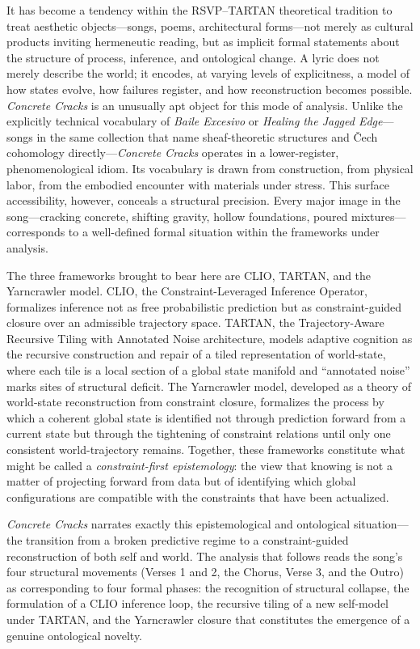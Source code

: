 \documentclass[12pt, a4paper]{article}
\begin{document}
It has become a tendency within the RSVP--TARTAN theoretical tradition to treat aesthetic objects---songs, poems, architectural forms---not merely as cultural products inviting hermeneutic reading, but as implicit formal statements about the structure of process, inference, and ontological change. A lyric does not merely describe the world; it encodes, at varying levels of explicitness, a model of how states evolve, how failures register, and how reconstruction becomes possible. \textit{Concrete Cracks} is an unusually apt object for this mode of analysis. Unlike the explicitly technical vocabulary of \textit{Baile Excesivo} or \textit{Healing the Jagged Edge}---songs in the same collection that name sheaf-theoretic structures and Čech cohomology directly---\textit{Concrete Cracks} operates in a lower-register, phenomenological idiom. Its vocabulary is drawn from construction, from physical labor, from the embodied encounter with materials under stress. This surface accessibility, however, conceals a structural precision. Every major image in the song---cracking concrete, shifting gravity, hollow foundations, poured mixtures---corresponds to a well-defined formal situation within the frameworks under analysis.

The three frameworks brought to bear here are CLIO, TARTAN, and the Yarncrawler model. CLIO, the Constraint-Leveraged Inference Operator, formalizes inference not as free probabilistic prediction but as constraint-guided closure over an admissible trajectory space. TARTAN, the Trajectory-Aware Recursive Tiling with Annotated Noise architecture, models adaptive cognition as the recursive construction and repair of a tiled representation of world-state, where each tile is a local section of a global state manifold and ``annotated noise'' marks sites of structural deficit. The Yarncrawler model, developed as a theory of world-state reconstruction from constraint closure, formalizes the process by which a coherent global state is identified not through prediction forward from a current state but through the tightening of constraint relations until only one consistent world-trajectory remains. Together, these frameworks constitute what might be called a \textit{constraint-first epistemology}: the view that knowing is not a matter of projecting forward from data but of identifying which global configurations are compatible with the constraints that have been actualized.

\textit{Concrete Cracks} narrates exactly this epistemological and ontological situation---the transition from a broken predictive regime to a constraint-guided reconstruction of both self and world. The analysis that follows reads the song's four structural movements (Verses 1 and 2, the Chorus, Verse 3, and the Outro) as corresponding to four formal phases: the recognition of structural collapse, the formulation of a CLIO inference loop, the recursive tiling of a new self-model under TARTAN, and the Yarncrawler closure that constitutes the emergence of a genuine ontological novelty.
\end{document}
